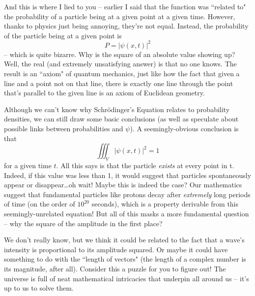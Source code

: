 \documentclass{article}
\begin{document}
And this is where I lied to you -- earlier I said that the function was ``related to" the probability of a particle being at a given point at a given time. However, thanks to physics just being annoying, they're not equal. Instead, the probability of the particle being at a given point is
\[P=|\psi(x,t)|^2\]
-- which is quite bizarre. Why is the square of an absolute value showing up? Well, the real (and extremely unsatisfying answer) is that no one knows. The result is an ``axiom" of quantum mechanics, just like how the fact that given a line and a point not on that line, there is exactly one line through the point that's parallel to the given line is an axiom of Euclidean geometry. 

Although we can't know why Schrödinger's Equation relates to probability densities, we can still draw some basic conclusions (as well as speculate about possible links between probabilities and $\psi$). A seemingly-obvious conclusion is that 
\[\iiint_V |\psi(x,t)|^2 = 1\]
for a given time $t.$ All this says is that the particle \textit{exists} at every point in t. Indeed, if this value was less than 1, it would suggest that particles spontaneously appear or disappear\dots oh wait! Maybe this is indeed the case? Our mathematics suggest that fundamental particles like protons decay after \textit{extremely} long periods of time (on the order of $10^{20}$ seconds), which is a property derivable from this seemingly-unrelated equation! But all of this masks a more fundamental question -- why the square of the amplitude in the first place?

We don't really know, but we think it could be related to the fact that a wave's intensity is proportional to its amplitude squared. Or maybe it could have something to do with the ``length of vectors" (the length of a complex number is its magnitude, after all). Consider this a puzzle for you to figure out! The universe is full of neat mathematical intricacies that underpin all around us -- it's up to us to solve them.
\end{document}
